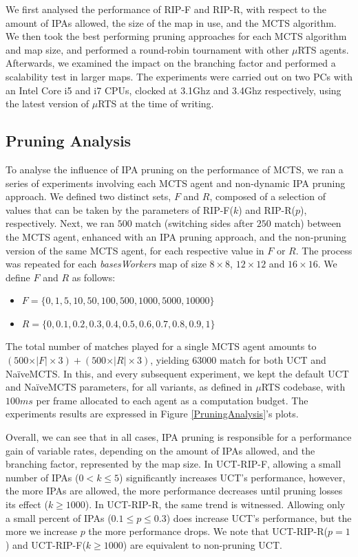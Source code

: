 \documentclass[conference]{IEEEtran}
\newcommand{\mRTS}{$\mu$RTS}
\begin{document}
We first analysed the performance of RIP-F and RIP-R, with respect to the amount of IPAs allowed, the size of the map in use, and the MCTS algorithm. We then took the best performing pruning approaches for each MCTS algorithm and map size, and performed a round-robin tournament with other \mRTS{} agents. Afterwards, we examined the impact on the branching factor and performed a scalability test in larger maps. The experiments were carried out on two PCs with an Intel Core i5 and i7 CPUs, clocked at 3.1Ghz and 3.4Ghz respectively, using the latest version of \mRTS{} at the time of writing.


\subsection{Pruning Analysis}

To analyse the influence of IPA pruning on the performance of MCTS, we ran a series of experiments involving each MCTS agent and non-dynamic IPA pruning approach. We defined two distinct sets, $F$ and $R$, composed of a selection of values that can be taken by the parameters of RIP-F($k$) and RIP-R($p$), respectively. Next, we ran $500$ match (switching sides after $250$ match) between the MCTS agent, enhanced with an IPA pruning approach, and the non-pruning version of the same MCTS agent, for each respective value in $F$ or $R$. The process was repeated for each \textit{basesWorkers} map of size $8\times8$, $12\times12$ and $16\times16$. We define $F$ and $R$ as follows:

\begin{itemize}
\item $F = \{0, 1, 5, 10, 50, 100, 500, 1000, 5000, 10000\}$
\item $R = \{0, 0.1, 0.2, 0.3, 0.4, 0.5, 0.6, 0.7, 0.8, 0.9, 1\}$
\end{itemize}

The total number of matches played for a single MCTS agent amounts to $(500\times\vert F\vert\times3) + (500\times\vert R\vert\times3)$, yielding $63000$ match for both UCT and NaïveMCTS. In this, and every subsequent experiment, we kept the default UCT and NaïveMCTS parameters, for all variants, as defined in \mRTS{} codebase, with $100ms$ per frame allocated to each agent as a computation budget. The experiments results are expressed in Figure \ref{PruningAnalysis}'s plots.

Overall, we can see that in all cases, IPA pruning is responsible for a performance gain of variable rates, depending on the amount of IPAs allowed, and the branching factor, represented by the map size. In UCT-RIP-F, allowing a small number of IPAs ($0 < k \leq 5$) significantly increases UCT's performance, however, the more IPAs are allowed, the more performance decreases until pruning losses its effect ($k \geq 1000$). In UCT-RIP-R, the same trend is witnessed. Allowing only a small percent of IPAs ($0.1 \leq p \leq 0.3$) does increase UCT's performance, but the more we increase $p$ the more performance drops. We note that UCT-RIP-R($p=1$) and UCT-RIP-F($k \geq 1000$) are equivalent to non-pruning UCT. 
\end{document}
